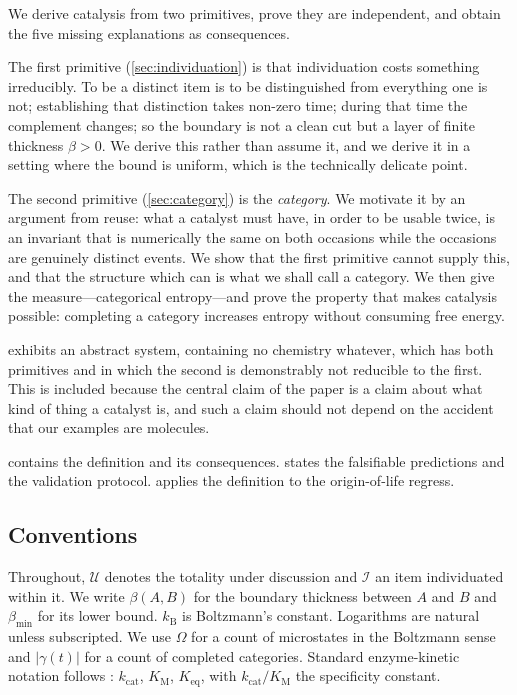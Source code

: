 \documentclass[11pt,twocolumn,a4paper]{article}
\theoremstyle{plain}
\theoremstyle{definition}
\theoremstyle{remark}
\newcommand{\kB}{k_{\mathrm{B}}}
\newcommand{\Univ}{\mathcal{U}}
\newcommand{\Item}{\mathcal{I}}
\newcommand{\thick}{\beta}
\newcommand{\floor}{\thick_{\min}}
\newcommand{\Compl}{\gamma}
\newcommand{\kcat}{k_{\mathrm{cat}}}
\newcommand{\KM}{K_{\mathrm{M}}}
\newcommand{\Keq}{K_{\mathrm{eq}}}
\begin{document}
We derive catalysis from two primitives, prove they are independent, and obtain
the five missing explanations as consequences.

The first primitive (\cref{sec:individuation}) is that individuation costs
something irreducibly. To be a distinct item is to be distinguished from
everything one is not; establishing that distinction takes non-zero time; during
that time the complement changes; so the boundary is not a clean cut but a layer
of finite thickness $\thick > 0$. We derive this rather than assume it, and we
derive it in a setting where the bound is uniform, which is the technically
delicate point.

The second primitive (\cref{sec:category}) is the \emph{category}. We motivate it
by an argument from reuse: what a catalyst must have, in order to be usable
twice, is an invariant that is numerically the same on both occasions while the
occasions are genuinely distinct events. We show that the first primitive cannot
supply this, and that the structure which can is what we shall call a category.
We then give the measure---categorical entropy---and prove the property that
makes catalysis possible: completing a category increases entropy without
consuming free energy.

 exhibits an abstract system, containing no chemistry
whatever, which has both primitives and in which the second is demonstrably not
reducible to the first. This is included because the central claim of the paper
is a claim about what kind of thing a catalyst is, and such a claim should not
depend on the accident that our examples are molecules.

 contains the definition and its consequences.
 states the falsifiable predictions and the validation
protocol.  applies the definition to the origin-of-life
regress.

\subsection{Conventions}
\label{sec:conventions}

Throughout, $\Univ$ denotes the totality under discussion and $\Item$ an item
individuated within it. We write $\thick(A,B)$ for the boundary thickness
between $A$ and $B$ and $\floor$ for its lower bound. $\kB$ is Boltzmann's
constant. Logarithms are natural unless subscripted. We use $\Omega$ for a count
of microstates in the Boltzmann sense \citep{boltzmann1877,gibbs1902} and
$|\Compl(t)|$ for a count of completed categories. Standard enzyme-kinetic
notation follows \citet{cornish1979}: $\kcat$, $\KM$, $\Keq$, with
$\kcat/\KM$ the specificity constant.
\end{document}
